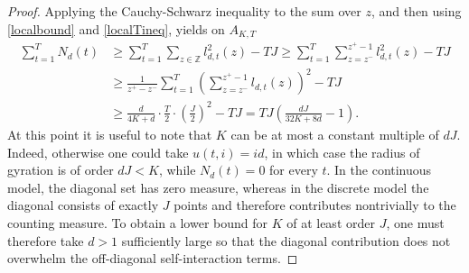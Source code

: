 \documentclass[12pt]{amsart}
\numberwithin{equation}{section}
\newcommand{\Z}{\mathbb{Z}}
\newcommand{\1}{\mathbf{1}}
\begin{document}
\begin{proof}
Applying the Cauchy-Schwarz inequality to the sum over $z$, and then using \eqref{localbound} and \eqref{localTineq}, yields on $A_{K,T}$
\begin{equation}
\begin{split}
\label{QmeasB}
\sum_{t=1}^{T}N_d(t)&\geq\sum_{t=1}^{T}\sum_{z\in\Z}l^2_{d,t}(z)-TJ\geq\sum_{t=1}^{T}\sum_{z=z^-}^{z^+-1}l^2_{d,t}(z)-TJ\\
    &\geq \frac{1}{z^+-z^-}\sum_{t=1}^{T}\left(\sum_{z=z^-}^{z^+-1}l_{d,t}(z)\right)^2-TJ\\
    &\geq \frac{d}{4K+d}\cdot\frac{T}{2}\cdot\left(\frac{J}{2}\right)^2-TJ = TJ\left(\frac{d J}{32K+8d}-1\right).
    \end{split}
\end{equation}
At this point it is useful to note that $K$ can be at most a constant multiple of $dJ$. Indeed, otherwise one could take $u(t,i)=id$, in which case the radius of gyration is of order $dJ<K$, while $N_d(t)=0$ for every $t$. In the continuous model, the diagonal set has zero measure, whereas in the discrete model the diagonal consists of exactly $J$ points and therefore contributes nontrivially to the counting measure. To obtain a lower bound for $K$ of at least order $J$, one must therefore take $d>1$ sufficiently large so that the diagonal contribution does not overwhelm the off-diagonal self-interaction terms.


\end{proof}
\end{document}
